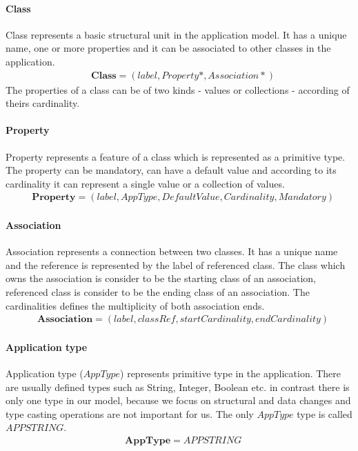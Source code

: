 \documentclass[11pt]{article}
\begin{document}
\paragraph{Class} Class represents a basic structural unit in the application model. It has a unique name, one or more properties and it can be associated to other classes in the application. 
\begin{align*}
& 	\mathbf{Class} = (label, Property*, Association*)
\end{align*}
The properties of a class can be of two kinds - values or collections - according of theirs cardinality.
	 
\paragraph{Property} Property represents a feature of a class which is represented as a primitive type. The property can be mandatory, can have a default value and according to its cardinality it can represent a single value or a collection of values. 
\begin{align*}
&	\mathbf{Property} = (label, AppType, DefaultValue, Cardinality, Mandatory)
\end{align*}

\paragraph {Association} Association represents a connection between two classes. It has a unique name and the reference is represented by the label of referenced class. The class which owns the association is consider to be the starting class of an association, referenced class is consider to be the ending class of an association. The cardinalities defines the multiplicity of both association ends.
\begin{align*}
&	\mathbf{Association} = (label, classRef, startCardinality, endCardinality) 
\end{align*}

\paragraph{Application type} Application type ($AppType$) represents primitive type in the application. There are usually defined types such as String, Integer, Boolean etc. in contrast there is only one type in our model, because we focus on structural and data changes and type casting operations are not important for us. The only $AppType$ type is called $APPSTRING$.
\begin{align*}
& \mathbf{AppType} = APPSTRING
\end{align*}
\end{document}
